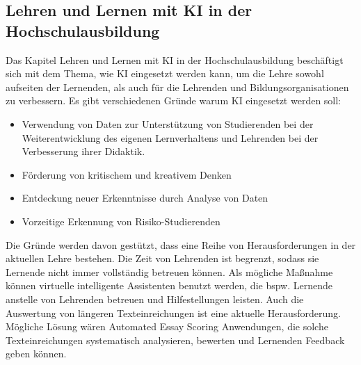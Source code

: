 \subsection{Lehren und Lernen mit KI in der Hochschulausbildung}
Das Kapitel \glqq{}Lehren und Lernen mit KI in der Hochschulausbildung\grqq{} beschäftigt sich mit dem Thema, wie \ac{KI} eingesetzt werden kann, um die Lehre sowohl aufseiten der Lernenden, als auch für die Lehrenden und Bildungsorganisationen zu verbessern. Es gibt verschiedenen Gründe warum \ac{KI} eingesetzt werden soll: \cite*[S. 11f]{Witt.2020}
\begin{itemize}
    \item Verwendung von Daten zur Unterstützung von Studierenden bei der Weiterentwicklung des eigenen Lernverhaltens und Lehrenden bei der Verbesserung ihrer Didaktik. \cite*[S. 11]{Witt.2020}
    \item Förderung von kritischem und kreativem Denken \cite*[S. 11]{Witt.2020}
    \item Entdeckung neuer Erkenntnisse durch Analyse von Daten \cite*[S. 11]{Witt.2020}
    \item Vorzeitige Erkennung von Risiko-Studierenden \cite*[S. 11]{Witt.2020}
\end{itemize}
\noindent
Die Gründe werden davon gestützt, dass eine Reihe von Herausforderungen in der aktuellen Lehre bestehen.
Die Zeit von Lehrenden ist begrenzt, sodass sie Lernende nicht immer vollständig betreuen können.
Als mögliche Maßnahme können virtuelle intelligente Assistenten benutzt werden, die bspw. Lernende anstelle von Lehrenden betreuen und Hilfestellungen leisten.
Auch die Auswertung von längeren Texteinreichungen ist eine aktuelle Herausforderung.
Mögliche Lösung wären Automated Essay Scoring Anwendungen, die solche Texteinreichungen systematisch analysieren, bewerten und Lernenden Feedback geben können. \cite*[S. 12]{Witt.2020}


